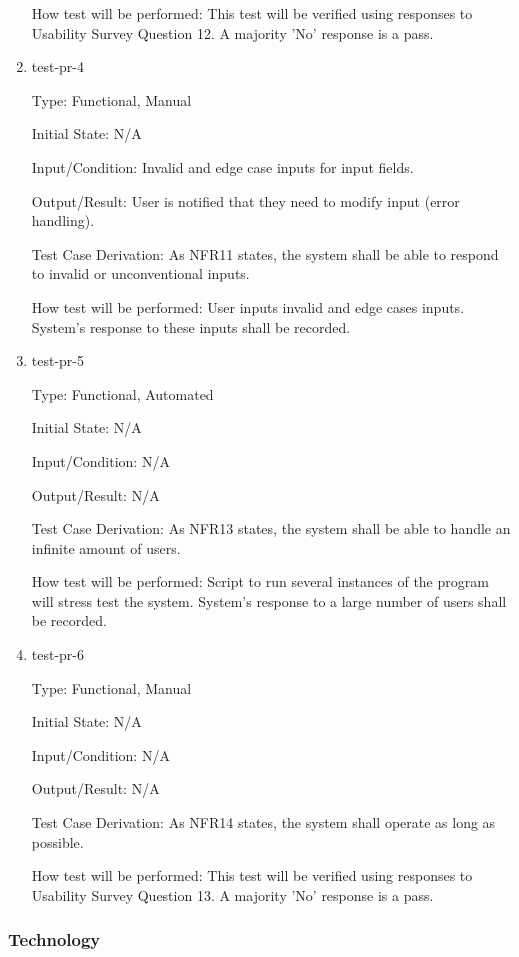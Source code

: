 \documentclass[12pt, titlepage]{article}
\begin{document}
\begin{enumerate}
How test will be performed: This test will be verified using responses to Usability Survey Question 12. A majority 'No' response is a pass.

\item{test-pr-4\\}

Type: Functional, Manual

Initial State: N/A	

Input/Condition: Invalid and edge case inputs for input fields. 

Output/Result: User is notified that they need to modify input (error handling). 

Test Case Derivation: As NFR11 states, the system shall be able to respond to invalid or unconventional inputs.

How test will be performed: User inputs invalid and edge cases inputs. System's response to these inputs shall be recorded.

\item{test-pr-5\\}

Type: Functional, Automated

Initial State: N/A	


Input/Condition: N/A

Output/Result: N/A

Test Case Derivation: As NFR13 states, the system shall be able to handle an infinite amount of users.

How test will be performed: Script to run several instances of the program will stress test the system. System's response to a large number of users shall be recorded. 

\item{test-pr-6\\}

Type: Functional, Manual

Initial State: N/A	

Input/Condition: N/A		

Output/Result: N/A

Test Case Derivation: As NFR14 states, the system shall operate as long as possible.

How test will be performed: This test will be verified using responses to Usability Survey Question 13. A majority 'No' response is a pass.

\end{enumerate}


\subsubsection{Technology}
\end{document}
